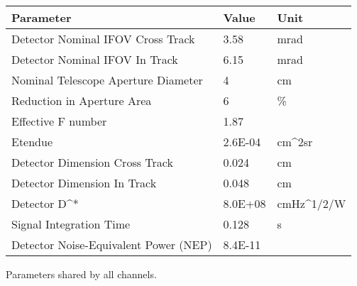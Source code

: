 \begin{tabular}{lll}
Parameter & Value & Unit\\
\hline
Detector Nominal IFOV Cross Track & 3.58 & mrad \\
Detector Nominal IFOV In Track & 6.15 & mrad \\
Nominal Telescope Aperture Diameter & 4 & cm\\
Reduction in Aperture Area & 6 & \% \\
Effective F number & 1.87 & \\
Etendue & 2.6E-04 & cm^{2}sr \\
Detector Dimension Cross Track & 0.024 & cm \\
Detector Dimension In Track & 0.048 & cm \\
Detector D^* & 8.0E+08 & cmHz^{1/2}/W \\
Signal Integration Time & 0.128 & s \\
Detector Noise-Equivalent Power (NEP) & 8.4E-11 & \\
\hline
\end{tabular}
\caption{\label{tab:parameters_shared} Parameters shared by all channels.}

